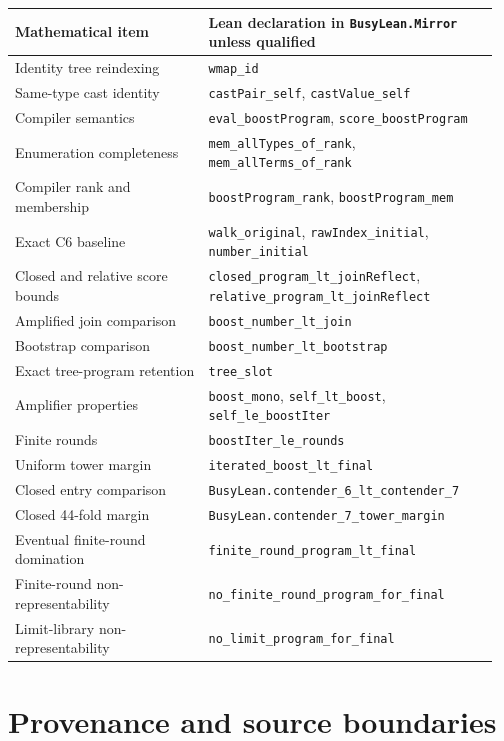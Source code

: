 \documentclass[11pt,letterpaper]{article}
\theoremstyle{definition}
\newcommand{\code}[1]{\nolinkurl{#1}}
\begin{document}
\begin{longtable}{@{}p{0.38\linewidth}p{0.58\linewidth}@{}}
\toprule
Mathematical item & Lean declaration in \code{BusyLean.Mirror} unless qualified\\
\midrule
\endhead
Identity tree reindexing & \code{wmap_id}\\
Same-type cast identity & \code{castPair_self}, \code{castValue_self}\\
Compiler semantics & \code{eval_boostProgram}, \code{score_boostProgram}\\
Enumeration completeness & \code{mem_allTypes_of_rank}, \code{mem_allTerms_of_rank}\\
Compiler rank and membership & \code{boostProgram_rank}, \code{boostProgram_mem}\\
Exact C6 baseline & \code{walk_original}, \code{rawIndex_initial}, \code{number_initial}\\
Closed and relative score bounds & \code{closed_program_lt_joinReflect}, \code{relative_program_lt_joinReflect}\\
Amplified join comparison & \code{boost_number_lt_join}\\
Bootstrap comparison & \code{boost_number_lt_bootstrap}\\
Exact tree-program retention & \code{tree_slot}\\
Amplifier properties & \code{boost_mono}, \code{self_lt_boost}, \code{self_le_boostIter}\\
Finite rounds & \code{boostIter_le_rounds}\\
Uniform tower margin & \code{iterated_boost_lt_final}\\
Closed entry comparison & \code{BusyLean.contender_6_lt_contender_7}\\
Closed 44-fold margin & \code{BusyLean.contender_7_tower_margin}\\
Eventual finite-round domination & \code{finite_round_program_lt_final}\\
Finite-round non-representability & \code{no_finite_round_program_for_final}\\
Limit-library non-representability & \code{no_limit_program_for_final}\\
\bottomrule
\end{longtable}

\section{Provenance and source boundaries}
\end{document}

